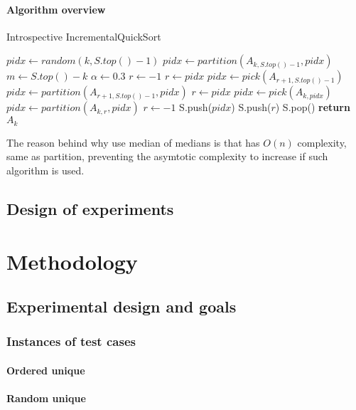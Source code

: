 \documentclass{iccmemoria}
\begin{document}
\subsubsection{Algorithm overview}
\begin{algorithm}
  \begin{algorithmic}[1]
    \caption{Introspective IncrementalQuickSort}\label{ALG:IIQS}
    \State $pidx \gets random(k,S.top()-1)$
    \State $pidx \gets partition(A_{k,S.top()-1}, pidx)$
    \State $m \gets S.top() - k$
    \State $\alpha \gets 0.3$
    \State $r \gets -1$
    \State $r \gets pidx$
    \State $pidx \gets pick(A_{r+1,S.top()-1})$
    \State $pidx \gets partition(A_{r+1,S.top()-1},pidx)$
    \State $r \gets pidx$
    \State $pidx \gets pick(A_{k,pidx})$
    \State $pidx \gets partition(A_{k,r}, pidx)$
    \State $r \gets -1$
    \EndIf
    \State S.push($pidx$)
    \State S.push($r$)
    \EndIf
    \EndWhile
    \State S.pop()
    \State \textbf{return} $A_{k}$\label{IIQS_main_cycle}
    \EndProcedure
  \end{algorithmic}
\end{algorithm}

The reason behind why use median of medians is that has $O(n)$ complexity, same as partition, preventing the asymtotic complexity to increase if such algorithm is used.

\section{Design of experiments}


\chapter{Methodology}
\section{Experimental design and goals}
\subsection{Instances of test cases}
\subsubsection{Ordered unique}
\subsubsection{Random unique}
\end{document}
